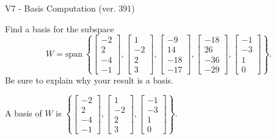 \begin{exercise}
  \begin{exerciseTitle}V7 - Basis Computation (ver. 391)\end{exerciseTitle}
  \begin{exerciseStatement}
    Find a basis for the subspace 
\[W=\mathrm{span}\ \left\{\left[\begin{array}{r}
-2 \\
2 \\
-4 \\
-1
\end{array}\right] , \left[\begin{array}{r}
1 \\
-2 \\
2 \\
3
\end{array}\right] , \left[\begin{array}{r}
-9 \\
14 \\
-18 \\
-17
\end{array}\right] , \left[\begin{array}{r}
-18 \\
26 \\
-36 \\
-29
\end{array}\right] , \left[\begin{array}{r}
-1 \\
-3 \\
1 \\
0
\end{array}\right]\right\}.\]
 Be sure to explain why your result is a basis.


  \end{exerciseStatement}
  \begin{exerciseAnswer}
   A basis of \(W\) is  \(\left\{\left[\begin{array}{r}
-2 \\
2 \\
-4 \\
-1
\end{array}\right] , \left[\begin{array}{r}
1 \\
-2 \\
2 \\
3
\end{array}\right] , \left[\begin{array}{r}
-1 \\
-3 \\
1 \\
0
\end{array}\right]\right\}\).
  


  \end{exerciseAnswer}
\end{exercise}